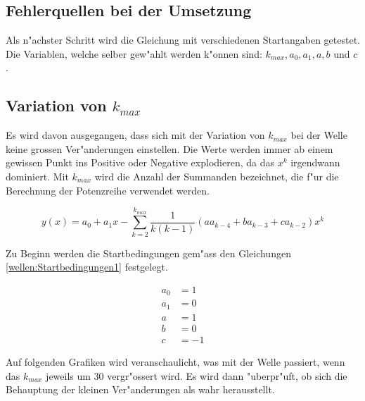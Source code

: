 \begin{refsection}
\section{Fehlerquellen bei der Umsetzung}
Als n"achster Schritt wird die Gleichung mit verschiedenen Startangaben 
getestet. Die Variablen, welche selber gew"ahlt werden k"onnen sind: $k_{max}, 
a_0, 
a_1, a, b$ und $c$.

\subsection{Variation von $k_{max}$}

Es wird davon ausgegangen, dass sich mit der Variation von $k_{max}$ bei der 
Welle keine grossen Ver"anderungen einstellen. Die Werte werden immer ab einem 
gewissen Punkt ins Positive oder Negative explodieren, da das $x^k$ irgendwann 
dominiert. Mit $k_{max}$ wird die Anzahl der Summanden bezeichnet, die f"ur die 
Berechnung der Potenzreihe verwendet werden. 

\begin{equation*}
y(x) = a_0 + a_1x 
-\sum_{k=2}^{k_{max}}\frac{1}{k(k-1)}(aa_{k-4}+ba_{k-3}+ca_{k-2})x^k
\end{equation*}

Zu Beginn werden die Startbedingungen gem"ass den Gleichungen 
\ref{wellen:Startbedingungen1} festgelegt.

\begin{equation}
	\begin{split}
		a_0 &= 1\\
		a_1 &= 0\\
		a &= 1\\
		b &= 0\\
		c &= -1
	\end{split}
	\label{wellen:Startbedingungen1}
\end{equation}

Auf folgenden Grafiken wird veranschaulicht, was mit der Welle passiert, wenn 
das $k_{max}$ jeweils um 30 vergr"ossert wird. Es wird dann "uberpr"uft, ob 
sich die Behauptung der kleinen Ver"anderungen als wahr herausstellt.



\end{refsection}
